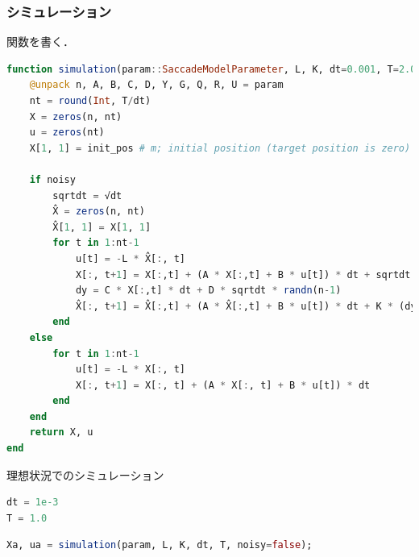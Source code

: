 \subsubsection{シミュレーション}
関数を書く．
\begin{lstlisting}[language=julia]
function simulation(param::SaccadeModelParameter, L, K, dt=0.001, T=2.0, init_pos=-0.5; noisy=true)
    @unpack n, A, B, C, D, Y, G, Q, R, U = param
    nt = round(Int, T/dt)
    X = zeros(n, nt)
    u = zeros(nt)
    X[1, 1] = init_pos # m; initial position (target position is zero)

    if noisy
        sqrtdt = √dt
        X̂ = zeros(n, nt)
        X̂[1, 1] = X[1, 1]
        for t in 1:nt-1
            u[t] = -L * X̂[:, t]
            X[:, t+1] = X[:,t] + (A * X[:,t] + B * u[t]) * dt + sqrtdt * (Y * u[t] * randn() + G * randn(n))
            dy = C * X[:,t] * dt + D * sqrtdt * randn(n-1)
            X̂[:, t+1] = X̂[:,t] + (A * X̂[:,t] + B * u[t]) * dt + K * (dy - C * X̂[:,t] * dt)
        end
    else
        for t in 1:nt-1
            u[t] = -L * X[:, t]
            X[:, t+1] = X[:, t] + (A * X[:, t] + B * u[t]) * dt
        end
    end
    return X, u
end
\end{lstlisting}
理想状況でのシミュレーション
\begin{lstlisting}[language=julia]
dt = 1e-3
T = 1.0
\end{lstlisting}
\begin{lstlisting}[language=julia]
Xa, ua = simulation(param, L, K, dt, T, noisy=false);
\end{lstlisting}
